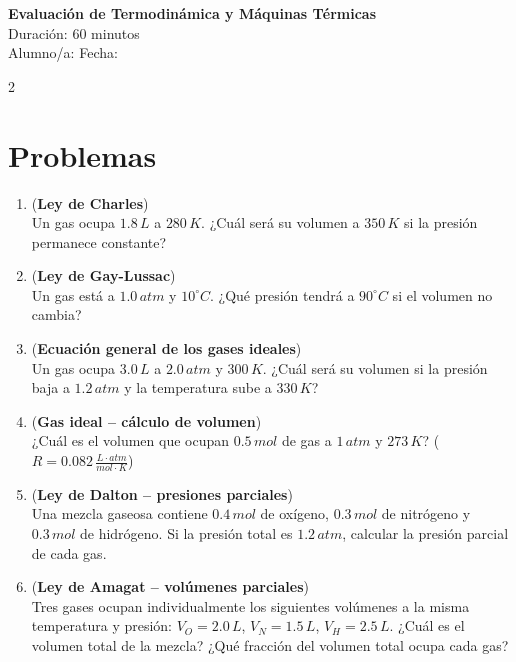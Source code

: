 \documentclass[a4paper,12pt]{article}
\begin{document}
\begin{center}
    \Large \textbf{Evaluación de Termodinámica y Máquinas Térmicas} \\
    \normalsize Duración: 60 minutos \\
    Alumno/a: \underline{\hspace{6cm}} \hspace{0.5cm} Fecha: \underline{\hspace{2cm}}
\end{center}

\vspace{0.3cm}

\begin{multicols}{2}

\section*{Problemas}

\begin{enumerate}
\item (\textbf{Ley de Charles})\\
Un gas ocupa $1.8\,L$ a $280\,K$. ¿Cuál será su volumen a $350\,K$ si la presión permanece constante?

\item (\textbf{Ley de Gay-Lussac})\\
Un gas está a $1.0\,atm$ y $10^\circ C$. ¿Qué presión tendrá a $90^\circ C$ si el volumen no cambia?

\item (\textbf{Ecuación general de los gases ideales})\\
Un gas ocupa $3.0\,L$ a $2.0\,atm$ y $300\,K$. ¿Cuál será su volumen si la presión baja a $1.2\,atm$ y la temperatura sube a $330\,K$?

\item (\textbf{Gas ideal – cálculo de volumen})\\
¿Cuál es el volumen que ocupan $0.5\,mol$ de gas a $1\,atm$ y $273\,K$? ($R = 0.082\,\frac{L \cdot atm}{mol \cdot K}$)

\item (\textbf{Ley de Dalton – presiones parciales})\\
Una mezcla gaseosa contiene $0.4\,mol$ de oxígeno, $0.3\,mol$ de nitrógeno y $0.3\,mol$ de hidrógeno. Si la presión total es $1.2\,atm$, calcular la presión parcial de cada gas.

\item (\textbf{Ley de Amagat – volúmenes parciales})\\
Tres gases ocupan individualmente los siguientes volúmenes a la misma temperatura y presión: $V_O = 2.0\,L$, $V_N = 1.5\,L$, $V_H = 2.5\,L$. ¿Cuál es el volumen total de la mezcla? ¿Qué fracción del volumen total ocupa cada gas?

\end{enumerate}

\vspace{0.2cm}

\end{multicols}
\end{document}
